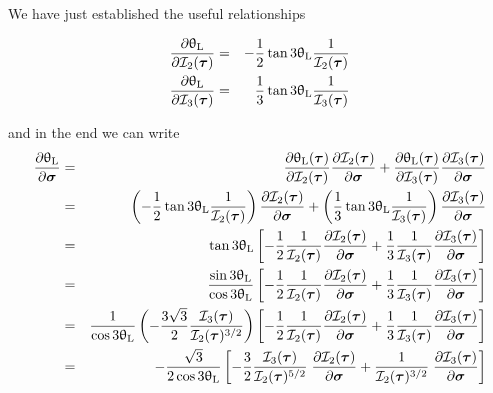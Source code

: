 We have just established the useful relationships
\begin{mdframed}[backgroundcolor=blue!5]
\begin{eqnarray}
\frac{\partial \uptheta_{\rm L}}{\partial {\cal I}_2(\bm\tau)}
&=& -\frac12 \tan 3\uptheta_{\rm L} \frac{1}{ {\cal I}_2(\bm\tau)}  \label{eq:dthetadI2} \\
\frac{\partial \uptheta_{\rm L}}{\partial {\cal I}_3(\bm\tau)}
&=& \frac13 \tan 3\uptheta_{\rm L} \frac{1}{{\cal I}_3(\bm\tau)}   \label{eq:dthetadI3}
\end{eqnarray}
\end{mdframed}
and in the end we can write
\begin{eqnarray}
\frac{\partial \uptheta_{\rm L}}{\partial \bm\sigma}
&=&
\frac{\partial \uptheta_{\rm L}(\bm\tau)}{\partial {\cal I}_2(\bm\tau)}
\frac{\partial {\cal I}_2(\bm\tau)}{\partial \bm\sigma}
+
\frac{\partial \uptheta_{\rm L}(\bm\tau)}{\partial {\cal I}_3(\bm\tau)}
\frac{\partial {\cal I}_3(\bm\tau)}{\partial \bm\sigma} \nonumber\\
&=&
\left(-\frac12 \tan 3\uptheta_{\rm L} \frac{1}{ {\cal I}_2(\bm\tau)}  \right)
\frac{\partial {\cal I}_2(\bm\tau)}{\partial \bm\sigma} 
+ 
\left(\frac13 \tan 3\uptheta_{\rm L} \frac{1}{{\cal I}_3(\bm\tau)} \right)
 \frac{\partial  {\cal I}_3(\bm\tau)}{\partial \bm\sigma} \nonumber\\
&=&
\tan 3\uptheta_{\rm L}
\left[
-\frac12  \frac{1}{ {\cal I}_2(\bm\tau)}
 \frac{\partial {\cal I}_2(\bm\tau)}{\partial \bm\sigma} 
+ \frac13 \frac{1}{{\cal I}_3(\bm\tau)} 
 \frac{\partial {\cal I}_3(\bm\tau)}{\partial \bm\sigma} 
\right]
\nonumber\\
&=&
\frac{\sin 3\uptheta_{\rm L}}{\cos 3\uptheta_{\rm L}}
\left[
-\frac12  \frac{1}{ {\cal I}_2(\bm\tau)}
 \frac{\partial {\cal I}_2(\bm\tau)}{\partial \bm\sigma} 
+ \frac13 \frac{1}{{\cal I}_3(\bm\tau)} 
 \frac{\partial {\cal I}_3(\bm\tau)}{\partial \bm\sigma} 
\right]
\nonumber\\
&=&
\frac{1}{\cos 3\uptheta_{\rm L}}
\left(-\frac{3\sqrt{3}}{2}  \frac{{\cal I}_3(\bm\tau)}{{\cal I}_2(\bm\tau)^{3/2}} \right)
\left[
-\frac12  \frac{1}{ {\cal I}_2(\bm\tau)}
 \frac{\partial {\cal I}_2(\bm\tau)}{\partial \bm\sigma} 
+ \frac13 \frac{1}{{\cal I}_3(\bm\tau)} 
 \frac{\partial {\cal I}_3(\bm\tau)}{\partial \bm\sigma} 
\right]
\nonumber\\
&=&
-\frac{\sqrt{3}}{2\cos 3\uptheta_{\rm L}}
\left[
-\frac32  \frac{ {\cal I}_3(\bm\tau)   }{ {\cal I}_2(\bm\tau)^{5/2}}
\; \frac{\partial {\cal I}_2(\bm\tau)}{\partial \bm\sigma} 
+  \frac{1}{{\cal I}_2(\bm\tau)^{3/2}} 
\; \frac{\partial {\cal I}_3(\bm\tau)}{\partial \bm\sigma} 
\right]
\end{eqnarray}
